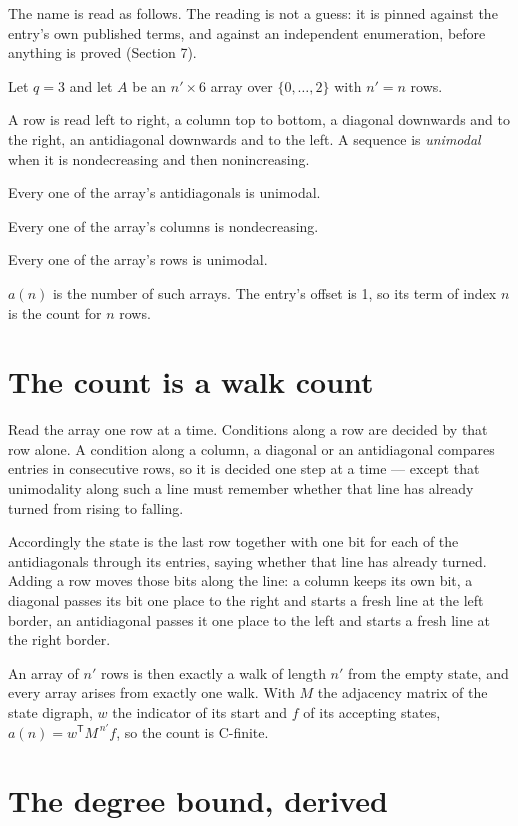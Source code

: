 \documentclass[11pt]{article}
\theoremstyle{definition}
\begin{document}
The name is read as follows. The reading is not a guess: it is pinned against the entry's own published terms, and against an independent enumeration, before anything is proved (Section 7).

Let $q = 3$ and let $A$ be an $n' \times 6$ array over $\{0,\dots,2\}$ with $n' = n$ rows.

A row is read left to right, a column top to bottom, a diagonal downwards and to the right, an antidiagonal downwards and to the left. A sequence is {\itshape unimodal} when it is nondecreasing and then nonincreasing.

Every one of the array's antidiagonals is unimodal.

Every one of the array's columns is nondecreasing.

Every one of the array's rows is unimodal.

$a(n)$ is the number of such arrays. The entry's offset is 1, so its term of index $n$ is the count for $n$ rows.

\section{The count is a walk count}

Read the array one row at a time. Conditions along a row are decided by that row alone. A condition along a column, a diagonal or an antidiagonal compares entries in consecutive rows, so it is decided one step at a time --- except that unimodality along such a line must remember whether that line has already turned from rising to falling.

Accordingly the state is the last row together with one bit for each of the antidiagonals through its entries, saying whether that line has already turned. Adding a row moves those bits along the line: a column keeps its own bit, a diagonal passes its bit one place to the right and starts a fresh line at the left border, an antidiagonal passes it one place to the left and starts a fresh line at the right border.

An array of $n'$ rows is then exactly a walk of length $n'$ from the empty state, and every array arises from exactly one walk. With $M$ the adjacency matrix of the state digraph, $w$ the indicator of its start and $f$ of its accepting states, $a(n) = w^{\mathsf T}M^{\,n'}f$, so the count is C-finite.

\section{The degree bound, derived}
\end{document}
